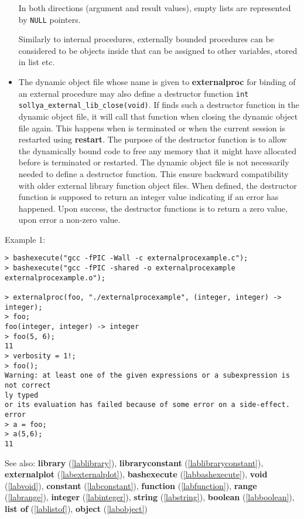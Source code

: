 \begin{itemize}
   In both directions (argument and result values), empty lists are represented
   by \texttt{NULL} pointers.
    
   Similarly to internal procedures, externally bounded procedures can be
   considered to be objects inside \sollya that can be assigned to other
   variables, stored in list etc.

\item The dynamic object file whose name is given to \textbf{externalproc} for binding of an
   external procedure may also define a destructor function \verb|int sollya_external_lib_close(void)|.
   If \sollya finds such a destructor function in the dynamic object file, it will call 
   that function when closing the dynamic object file again. This happens when \sollya
   is terminated or when the current \sollya session is restarted using \textbf{restart}.
   The purpose of the destructor function is to allow the dynamically bound code
   to free any memory that it might have allocated before \sollya is terminated 
   or restarted. 
   The dynamic object file is not necessarily needed to define a destructor
   function. This ensure backward compatibility with older \sollya external 
   library function object files.
   When defined, the destructor function is supposed to return an integer
   value indicating if an error has happened. Upon success, the destructor
   functions is to return a zero value, upon error a non-zero value.
\end{itemize}
\noindent Example 1: 
\begin{center}\begin{minipage}{15cm}\begin{Verbatim}[frame=single]
> bashexecute("gcc -fPIC -Wall -c externalprocexample.c");
> bashexecute("gcc -fPIC -shared -o externalprocexample externalprocexample.o");

> externalproc(foo, "./externalprocexample", (integer, integer) -> integer);
> foo;
foo(integer, integer) -> integer
> foo(5, 6);
11
> verbosity = 1!;
> foo();
Warning: at least one of the given expressions or a subexpression is not correct
ly typed
or its evaluation has failed because of some error on a side-effect.
error
> a = foo;
> a(5,6);
11
\end{Verbatim}
\end{minipage}\end{center}
See also: \textbf{library} (\ref{lablibrary}), \textbf{libraryconstant} (\ref{lablibraryconstant}), \textbf{externalplot} (\ref{labexternalplot}), \textbf{bashexecute} (\ref{labbashexecute}), \textbf{void} (\ref{labvoid}), \textbf{constant} (\ref{labconstant}), \textbf{function} (\ref{labfunction}), \textbf{range} (\ref{labrange}), \textbf{integer} (\ref{labinteger}), \textbf{string} (\ref{labstring}), \textbf{boolean} (\ref{labboolean}), \textbf{list of} (\ref{lablistof}), \textbf{object} (\ref{labobject})
